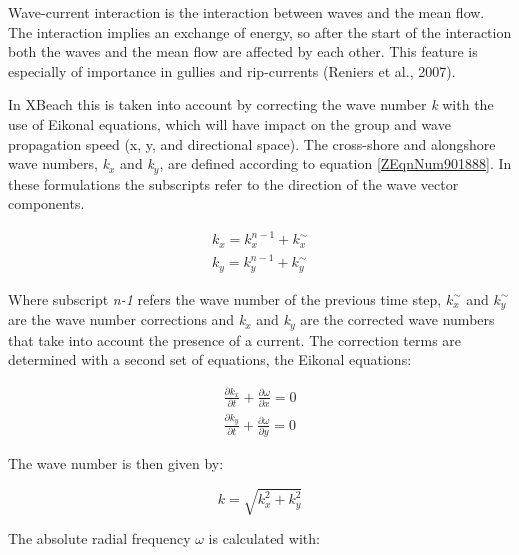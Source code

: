 \documentclass{article}
\begin{document}
\noindent Wave-current interaction is the interaction between waves and the mean flow. The interaction implies an exchange of energy, so after the start of the interaction both the waves and the mean flow are affected by each other. This feature is especially of importance in gullies and rip-currents (Reniers et al., 2007).

\noindent 

\noindent In XBeach this is taken into account by correcting the wave number \textit{k} with the use of Eikonal equations, which will have impact on the group and wave propagation speed (x, y, and directional space). The cross-shore and alongshore wave numbers, \textit{k${}_{x}$} and \textit{k${}_{y}$}, are defined according to equation \eqref{ZEqnNum901888}. In these formulations the subscripts refer to the direction of the wave vector components.

\noindent 
\begin{equation} \label{ZEqnNum901888} 
\begin{array}{l} {k_{x} =k_{x}^{n-1} +k_{x}^{\sim } } \\ {k_{y} =k_{y}^{n-1} +k_{y}^{\sim } } \end{array} 
\end{equation} 


\noindent Where subscript \textit{n-1} refers the wave number of the previous time step, $k_{x}^{\sim } $ and $k_{y}^{\sim } $ are the wave number corrections and \textit{k${}_{x}$} and \textit{k${}_{y}$} are the corrected wave numbers that take into account the presence of a current. The correction terms are determined with a second set of equations, the Eikonal equations: 

 
\begin{equation} \label{ZEqnNum227968} 
\begin{array}{l} {\frac{\partial k_{x} }{\partial t} +\frac{\partial \omega }{\partial x} =0} \\ {\frac{\partial k_{y} }{\partial t} +\frac{\partial \omega }{\partial y} =0} \end{array} 
\end{equation} 


\noindent The wave number is then given by:

\noindent 
\begin{equation} \label{2.7)} 
k=\sqrt{k_{x}^{2} +k_{y}^{2} }  
\end{equation} 


\noindent The absolute radial frequency \textit{$\omega $} is calculated with:
\end{document}
